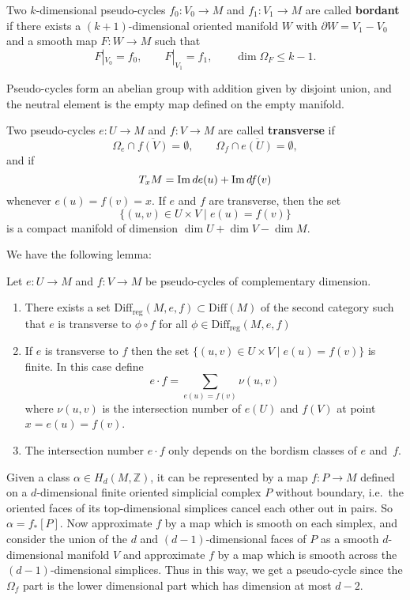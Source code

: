 \documentclass[twoside]{article}
\begin{document}
Two $k$-dimensional pseudo-cycles $f_0\colon V_0\rightarrow M$ and $f_1\colon V_1\rightarrow M$ are called \textbf{bordant} 
if there exists a $(k+1)$-dimensional oriented manifold $W$ with $\partial W=V_1-V_0$ 
and a smooth map $F\colon W\rightarrow M$ such that 
\[F|_{V_0}=f_0, \qquad F|_{V_1}=f_1, \qquad \dim \Omega_F\leq k-1.\]

Pseudo-cycles form an abelian group with addition given by disjoint union, 
and the neutral element is the empty map defined on the empty manifold.

Two pseudo-cycles $e\colon U\rightarrow M$ and $f\colon V\rightarrow M$ are called \textbf{transverse} if
\[\Omega_e\cap \overline{f(V)}=\emptyset, \qquad \Omega_f\cap\overline{e(U)}=\emptyset,\]
and if
\[T_xM=\operatorname{Im} de(u)+\operatorname{Im} df(v)\]
whenever $e(u)=f(v)=x$. If $e$ and $f$ are transverse, then the set
\[\{(u,v)\in U\times V\mid e(u)=f(v)  \}\]
is a compact manifold of dimension $\dim U+\dim V-\dim M$.

We have the following lemma:

\begin{lemma}
Let $e\colon U\rightarrow M$ and $f\colon V\rightarrow M$ be pseudo-cycles of complementary dimension.
    \begin{enumerate}
        \item There exists a set $\mathrm{Diff}_{\mathrm{reg}}(M,e,f)\subset\mathrm{Diff}(M)$ of the second category 
        such that $e$ is transverse to $\phi\circ f$ for all $\phi\in\mathrm{Diff}_{\mathrm{reg}}(M,e,f)$
        \item If $e$ is transverse to $f$ then the set $\{(u,v)\in U\times V\mid e(u)=f(v)  \}$ is finite. 
        In this case define
        \[e\cdot f=\sum_{e(u)=f(v)}\nu(u,v)\]
        where $\nu(u,v)$ is the intersection number of $e(U)$ and $f(V)$ at point $x=e(u)=f(v)$.
        \item The intersection number $e\cdot f$ only depends on the bordism classes of $e$ and~$f$.
    \end{enumerate}
\end{lemma}

Given a class $\alpha\in H_d(M,\mathbb{Z})$, it can be represented by a map $f\colon P\rightarrow M$ 
defined on a $d$-dimensional finite oriented simplicial complex $P$ without boundary, 
i.e.\ the oriented faces of its top-dimensional simplices cancel each other out in pairs. 
So $\alpha=f_*[P]$. Now approximate $f$ by a map which is smooth on each simplex, 
and consider the union of the $d$ and $(d-1)$-dimensional faces of $P$ 
as a smooth $d$-dimensional manifold $V$ and approximate $f$ by a map 
which is smooth across the $(d-1)$-dimensional simplices. Thus in this way, 
we get a pseudo-cycle since the $\Omega_f$ part is the lower dimensional part which has dimension at most $d-2$.
\end{document}
